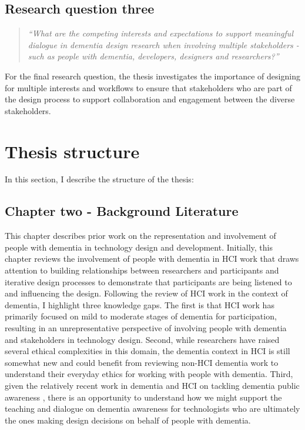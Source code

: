 \subsection{Research question three}
\label{RQ3}
\begin{quote}
\textit{``What are the competing interests and expectations to support meaningful dialogue in dementia design research when involving multiple stakeholders - such as people with dementia, developers, designers and researchers?''}
\end{quote}
For the final research question, the thesis investigates the importance of designing for multiple interests and workflows to ensure that stakeholders who are part of the design process to support collaboration and engagement between the diverse stakeholders. 

\section{Thesis structure}
\label{Intro: Thesis structure}
In this section, I describe the structure of the thesis:

\subsection{Chapter two - Background Literature}
\label{Intro:ChapterTwo}
This chapter describes prior work on the representation and involvement of people with dementia in technology design and development. Initially, this chapter reviews the involvement of people with dementia in HCI work that draws attention to building relationships between researchers and participants and iterative design processes to demonstrate that participants are being listened to and influencing the design. Following the review of HCI work in the context of dementia, I highlight three knowledge gaps. The first is that HCI work has primarily focused on mild to moderate stages of dementia for participation, resulting in an unrepresentative perspective of involving people with dementia and stakeholders in technology design. Second, while researchers have raised several ethical complexities in this domain, the dementia context in HCI is still somewhat new and could benefit from reviewing non-HCI dementia work to understand their everyday ethics for working with people with dementia. Third, given the relatively recent work in dementia and HCI on tackling dementia public awareness \citep{lazar_safe_2019,talbot_how_2020}, there is an opportunity to understand how we might support the teaching and dialogue on dementia awareness for technologists who are ultimately the ones making design decisions on behalf of people with dementia.  

